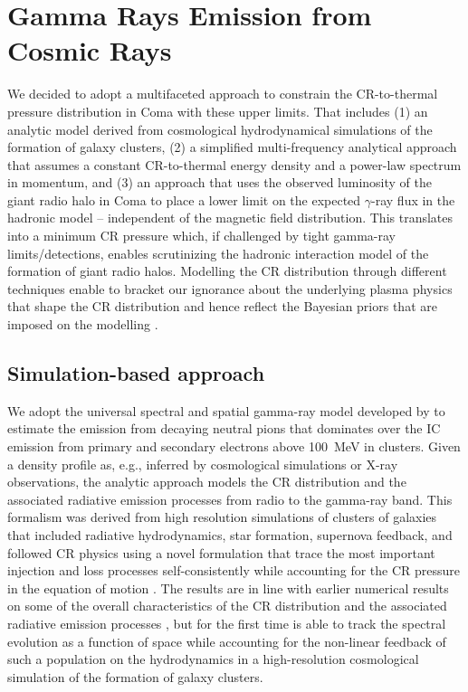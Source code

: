 \documentclass[12pt,manuscript]{aastex}
\begin{document}
\section{Gamma Rays Emission from Cosmic Rays}
We decided to adopt a multifaceted approach to constrain the CR-to-thermal
pressure distribution in Coma with these upper limits. That includes (1) an
analytic model derived from cosmological hydrodynamical simulations of the
formation of galaxy clusters, (2) a simplified multi-frequency analytical
approach that assumes a constant CR-to-thermal energy density and a power-law
spectrum in momentum, and (3) an approach that uses the observed luminosity of
the giant radio halo in Coma to place a lower limit on the expected $\gamma$-ray
flux in the hadronic model -- independent of the magnetic field distribution.
This translates into a minimum CR pressure which, if challenged by tight
gamma-ray limits/detections, enables scrutinizing the hadronic interaction model
of the formation of giant radio halos.  Modelling the CR distribution through
different techniques enable to bracket our ignorance about the underlying plasma
physics that shape the CR distribution and hence reflect the Bayesian priors
that are imposed on the modelling \citep[see][for a
discussion]{article:PinzkePfrommerBergstrom}.

\subsection{Simulation-based approach}
We adopt the universal spectral and spatial gamma-ray model developed by
\citet{article:PinzkePfrommer:2010} to estimate the emission from decaying neutral pions
that dominates over the IC emission from primary and secondary electrons above
100~MeV in clusters. Given a density profile as, e.g., inferred by cosmological
simulations or X-ray observations, the analytic approach models the CR
distribution and the associated radiative emission processes from radio to the
gamma-ray band.  This formalism was derived from high resolution simulations of
clusters of galaxies that included radiative hydrodynamics, star formation,
supernova feedback, and followed CR physics using a novel formulation that trace
the most important injection and loss processes self-consistently while
accounting for the CR pressure in the equation of motion
\citep{article:PfrommerSpringelEnsslinJubelgas, article:EnsslinPfrommerSpringelJubelgas:2007, article:JubelgasSpringelEnsslinPfrommer:2008}.  The
results are in line with earlier numerical results on some of the overall
characteristics of the CR distribution and the associated radiative emission
processes \citep{article:DolagEnsslin, article:MiniatiRyuKangJones:2001, article:Miniati:2003, article:Pfrommer_etal:2007, article:PfrommerEnsslinSpringel:2008, article:Pfrommer:2008}, but for the
first time is able to track the spectral evolution as a function of space while
accounting for the non-linear feedback of such a population on the hydrodynamics
in a high-resolution cosmological simulation of the formation of galaxy
clusters.
 
\end{document}
